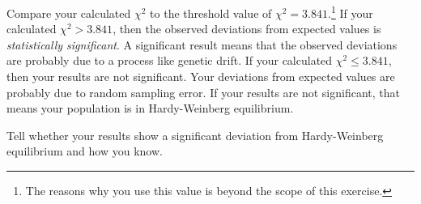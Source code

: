 \documentclass[12pt, hidelinks]{exam}
\begin{document}
\begin{questions}
Compare your calculated $\chi^2$ to the threshold value of $\chi^2 = 3.841$.\footnote{The reasons why you use this value is beyond the scope of this exercise.} If your calculated $\chi^2 > 3.841$, then the observed deviations from expected values is \emph{statistically significant}. A significant result means that the observed deviations are probably due to a process like genetic drift. If your calculated $\chi^2 \le 3.841$, then your results are not significant. Your deviations from expected values are probably due to random sampling error. If your results are not significant, that means your population is in Hardy-Weinberg equilibrium.

\question[Checkout]
Tell whether your results show a significant deviation from Hardy-Weinberg equilibrium and how you know. 

\newpage


\end{questions}
\end{document}
